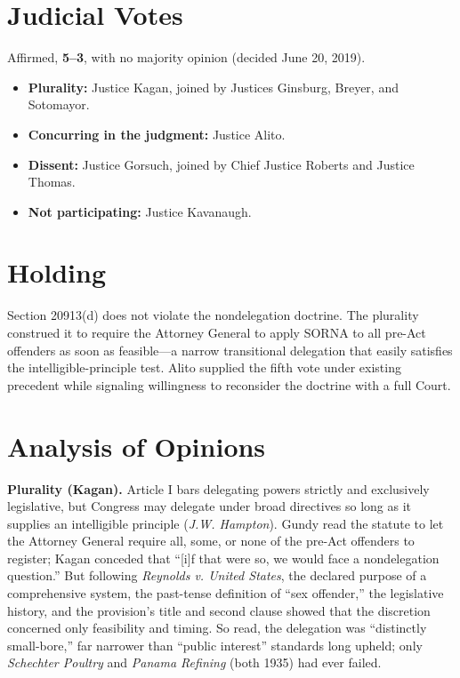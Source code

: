 \documentclass[12pt]{article}
\begin{document}
\section{Judicial Votes}

Affirmed, \textbf{5--3}, with no majority opinion (decided June 20, 2019).
\begin{itemize}
\item \textbf{Plurality:} Justice Kagan, joined by Justices Ginsburg, Breyer, and Sotomayor.
\item \textbf{Concurring in the judgment:} Justice Alito.
\item \textbf{Dissent:} Justice Gorsuch, joined by Chief Justice Roberts and Justice Thomas.
\item \textbf{Not participating:} Justice Kavanaugh.
\end{itemize}

\section{Holding}

Section 20913(d) does not violate the nondelegation doctrine. The plurality construed it to require the Attorney General to apply SORNA to all pre-Act offenders as soon as feasible---a narrow transitional delegation that easily satisfies the intelligible-principle test. Alito supplied the fifth vote under existing precedent while signaling willingness to reconsider the doctrine with a full Court.

\section{Analysis of Opinions}

\textbf{Plurality (Kagan).} Article I bars delegating powers strictly and exclusively legislative, but Congress may delegate under broad directives so long as it supplies an intelligible principle (\textit{J.W. Hampton}). Gundy read the statute to let the Attorney General require all, some, or none of the pre-Act offenders to register; Kagan conceded that ``[i]f that were so, we would face a nondelegation question.'' But following \textit{Reynolds v. United States}, the declared purpose of a comprehensive system, the past-tense definition of ``sex offender,'' the legislative history, and the provision's title and second clause showed that the discretion concerned only feasibility and timing. So read, the delegation was ``distinctly small-bore,'' far narrower than ``public interest'' standards long upheld; only \textit{Schechter Poultry} and \textit{Panama Refining} (both 1935) had ever failed.
\end{document}
